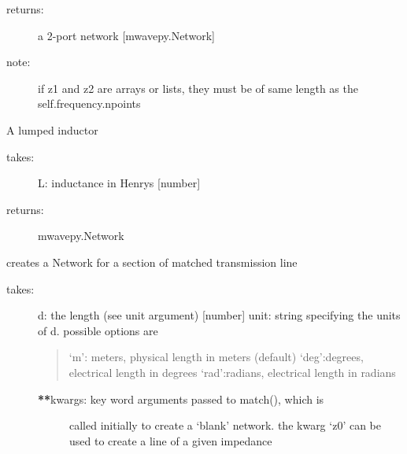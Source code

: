 \documentclass[letterpaper,10pt,english]{sphinxmanual}
\begin{document}
\begin{fulllineitems}
\begin{fulllineitems}
\begin{description}
\item[{returns:}] \leavevmode
a 2-port network {[}mwavepy.Network{]}

\item[{note:}] \leavevmode
if z1 and z2 are arrays or lists, they must be of same length
as the self.frequency.npoints

\end{description}

\end{fulllineitems}


\begin{fulllineitems}
\label{api/mwavepy.media:mwavepy.media.media.Media.inductor}
A lumped inductor
\begin{description}
\item[{takes:}] \leavevmode
L: inductance in Henrys {[}number{]}

\item[{returns:}] \leavevmode
mwavepy.Network

\end{description}

\end{fulllineitems}


\begin{fulllineitems}
\label{api/mwavepy.media:mwavepy.media.media.Media.line}
creates a Network for a section of matched transmission line
\begin{description}
\item[{takes:}] \leavevmode
d: the length (see unit argument) {[}number{]}
unit: string specifying the units of d. possible options are
\begin{quote}

`m': meters, physical length in meters (default)
`deg':degrees, electrical length in degrees
`rad':radians, electrical length in radians
\end{quote}
\begin{description}
\item[{{\color{red}\bfseries{}**}kwargs: key word arguments passed to match(), which is }] \leavevmode
called initially to create a `blank' network. the kwarg
`z0' can be used to create a line of a given impedance


\end{description}
\end{description}
\end{fulllineitems}
\end{fulllineitems}
\end{document}
